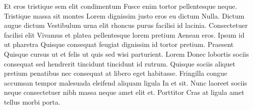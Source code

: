 Et eros tristique sem elit condimentum Fusce enim tortor pellentesque neque. Tristique massa sit montes Lorem dignissim justo eros eu dictum Nulla. Dictum augue dictum Vestibulum urna elit rhoncus purus facilisi id lacinia. Consectetuer facilisi elit Vivamus et platea pellentesque lorem pretium Aenean eros. Ipsum id ut pharetra Quisque consequat feugiat dignissim id tortor pretium. Praesent Quisque cursus ut et felis ut quis sed wisi parturient. Lorem Donec lobortis sociis consequat sed hendrerit tincidunt tincidunt id rutrum. Quisque sociis aliquet pretium penatibus nec consequat at libero eget habitasse. Fringilla congue accumsan tempor malesuada eleifend aliquam ligula In et sit. Nunc laoreet sociis neque consectetuer nibh massa neque amet elit et. Porttitor Cras at ligula amet tellus morbi porta.
